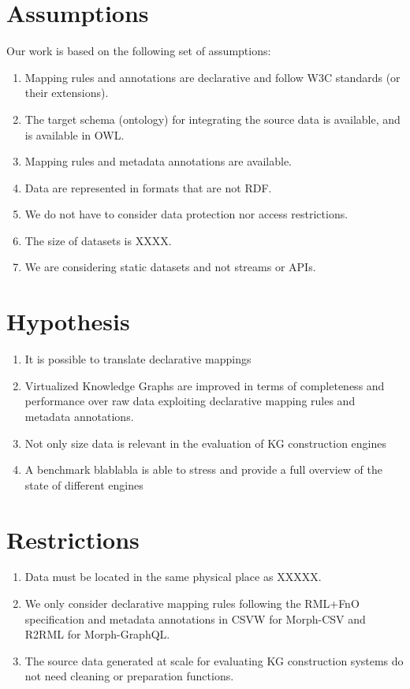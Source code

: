 \section{Assumptions}
Our work is based on the following set of assumptions:
\begin{enumerate}[label=\textbf{A{\arabic*}}]
    \item Mapping rules and annotations are declarative and follow W3C standards (or their extensions). 
    \item The target schema (ontology) for integrating the source data is available, and is available in OWL.
    \item Mapping rules and metadata annotations are available.
    \item Data are represented in formats that are not RDF.
    \item We do not have to consider data protection nor access restrictions.
    \item The size of datasets is XXXX.
    \item We are considering static datasets and not streams or APIs.
\end{enumerate}

\section{Hypothesis}

\begin{enumerate}[label=\textbf{H{\arabic*}}]
    \item It is possible to translate declarative mappings
    \item Virtualized Knowledge Graphs are improved in terms of completeness and performance over raw data exploiting declarative mapping rules and metadata annotations.
    \item Not only size data is relevant in the evaluation of KG construction engines
    \item A benchmark blablabla is able to stress and provide a full overview of the state of different engines 
\end{enumerate}

\section{Restrictions}

\begin{enumerate}[label=\textbf{R{\arabic*}}]
    \item Data must be located in the same physical place as XXXXX.
    \item We only consider declarative mapping rules following the RML+FnO~\citep{de2017declarative} specification and metadata annotations in CSVW for Morph-CSV and R2RML for Morph-GraphQL.
    \item The source data generated at scale for evaluating KG construction systems do not need cleaning or preparation functions.
\end{enumerate}
